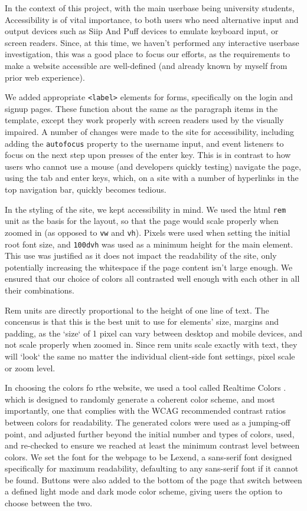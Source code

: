 \documentclass[12pt]{article}
\begin{document}
In the context of this project, with the main userbase being university students, Accessibility is of vital importance, to both users who need alternative input and output devices such as Siip And Puff devices to emulate keyboard input, or screen readers. Since, at this time, we haven't performed any interactive userbase investigation, this was a good place to focus our efforts, as the requirements to make a website accessible are well-defined (and already known by myself from prior web experience).

We added appropriate \texttt{<label>} elements for forms, specifically on the login and signup pages. These function about the same as the paragraph items in the template, except they work properly with screen readers used by the visually impaired. A number of changes were made to the site for accessibility, including adding the \texttt{autofocus} property to the username input, and event listeners to focus on the next step upon presses of the enter key. This is in contrast to how users who cannot use a mouse (and developers quickly testing) navigate the page, using the tab and enter keys, which, on a site with a number of hyperlinks in the top navigation bar, quickly becomes tedious.

In the styling of the site, we kept accessibility in mind. We used  the html \texttt{rem} unit as the basis for the layout, so that the page would scale properly when zoomed in (as opposed to \texttt{vw} and \texttt{vh}). Pixels were used when setting the initial root font size, and \texttt{100dvh} was used as a minimum height for the main element. This use was justified as it does not impact the readability of the site, only potentially increasing the whitespace if the page content isn't large enough. We ensured that our choice of colors all contrasted well enough with each other in all their combinations.

Rem units are directly proportional to the height of one line of text. The concensus is that this is the best unit to use for elements' size, margins and padding, as the `size` of 1 pixel can vary between desktop and mobile devices, and not scale properly when zoomed in. Since rem units scale exactly with text, they will `look` the same no matter the individual client-side font settings, pixel scale or zoom level.

In choosing the colors fo rthe website, we used a tool called Realtime Colors \cite{rt-colors}. which is designed to randomly generate a coherent color scheme, and most importantly, one that complies with the WCAG recommended contrast ratios between colors for readability. The generated colors were used as a jumping-off point, and adjusted further beyond the initial number and types of colors, used, and re-checked to ensure we reached at least the minimum contrast level between colors. We set the font for the webpage to be Lexend, a sans-serif font designed specifically for maximum readability, defaulting to any sans-serif font if it cannot be found. Buttons were also added to the bottom of the page that switch between a defined light mode and dark mode color scheme, giving users the option to choose between the two.
\end{document}
